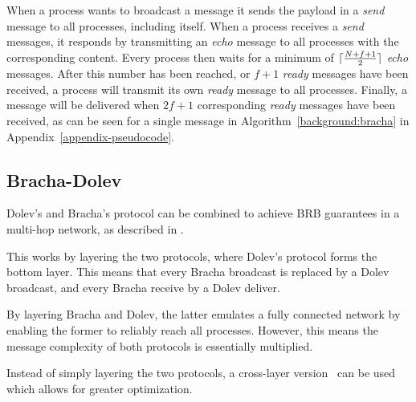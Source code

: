 When a process wants to broadcast a message it sends the payload in a \textit{send} message to all processes, including itself. When a process receives a \textit{send} messages, it responds by transmitting an \textit{echo} message to all processes with the corresponding content. Every process then waits for a minimum of $\lceil\frac{N+f+1}{2}\rceil$ \textit{echo} messages. 
After this number has been reached, or $f+1$ \textit{ready} messages have been received, a process will transmit its own \textit{ready} message to all processes. Finally, a message will be delivered when $2f+1$ corresponding \textit{ready} messages have been received, as can be seen for a single message in Algorithm~\ref{background:bracha} in Appendix~\ref{appendix-pseudocode}.

\subsection*{Bracha-Dolev}
Dolev's and Bracha's protocol can be combined to achieve BRB guarantees in a multi-hop network, as described in \cite{bracha-dolev}. 

This works by layering the two protocols, where Dolev's protocol forms the bottom layer. This means that every Bracha broadcast is replaced by a Dolev broadcast, and every Bracha receive by a Dolev deliver. %

By layering Bracha and Dolev, the latter emulates a fully connected network by enabling the former to reliably reach all processes. However, this means the message complexity of both protocols %
is essentially multiplied.

Instead of simply layering the two protocols, a cross-layer version~\cite{bonomi2021practical} can be used which allows for greater optimization. 

